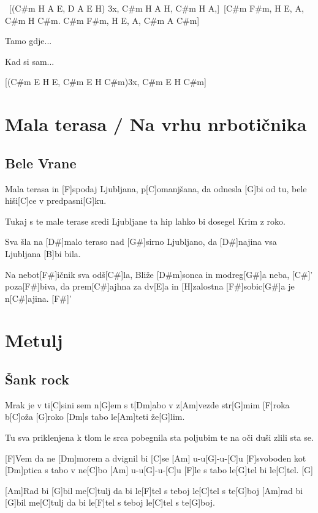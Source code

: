 \documentclass[a4paper,12pt]{article}
\begin{document}
\begin{multicols}{2}
\begin{guitar}
[C#m F#m, H E, A, C#m H C#m. C#m F#m, H E, A, C#m A]\
[(C#m H A E, D A E H) 3x, C#m H A H, C#m H A,]\
[C#m F#m, H E, A, C#m H C#m. C#m F#m, H E, A, C#m A C#m]\



Tamo gdje...

Kad si sam...



[(C#m E H E, C#m E H C#m)3x, C#m E H C#m]


\end{guitar}
\section{Mala terasa / Na vrhu nrbotičnika}
\subsection*{Bele Vrane}
\begin{guitar}
[C]Mala terasa in 
[F]spodaj Ljubljana, p[C]omanjšana,
da odnesla [G]bi od tu,
bele hiši[C]ce v predpasni[G]ku.

 
Tukaj s te male terase 
sredi Ljubljane ta hip lahko
bi dosegel Krim z roko.


Sva šla na [D#]malo teraso 
nad [G#]sirno Ljubljano,
da [D#]najina vsa Ljubljana [B]bi bila.


Na nebot[F#]ičnik sva odš[C#]la,
Bliže [D#m]sonca in modreg[G#]a neba, [C#]'
poza[F#]biva, da prem[C#]ajhna za dv[E]a 
in [H]zalostna [F#]sobic[G#]a je n[C#]ajina. [F#]'

\end{guitar}
\section{Metulj}
\subsection*{Šank rock}
\begin{guitar}
[F]Mrak je
v ti[C]sini sem n[G]em
s t[Dm]abo v z[Am]vezde str[G]mim
[F]roka b[C]oža [G]roko
[Dm]s tabo le[Am]teti že[G]lim.


Tu sva
priklenjena k tlom
le srca pobegnila sta
poljubim te na oči
duši zlili sta se.


[F]Vem da ne [Dm]morem
a dvignil bi [C]se [Am] u-u[G]-u-[C]u
[F]svoboden kot [Dm]ptica
s tabo v ne[C]bo [Am] u-u[G]-u-[C]u
[F]le s tabo le[G]tel bi le[C]tel. [G]


[Am]Rad bi [G]bil me[C]tulj
da bi le[F]tel s teboj
le[C]tel s te[G]boj
[Am]rad bi [G]bil me[C]tulj
da bi le[F]tel s teboj
le[C]tel s te[G]boj.



\end{guitar}
\end{multicols}
\end{document}
